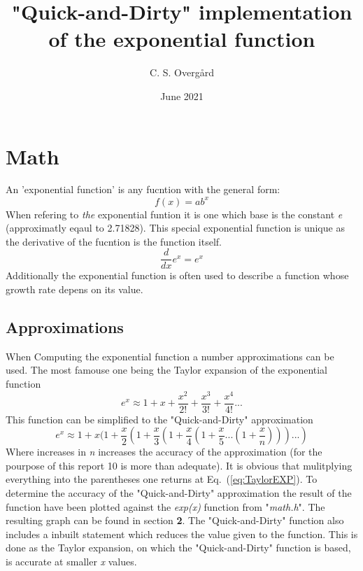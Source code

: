 \documentclass[12pt]{article}
\begin{document}
\title{"Quick-and-Dirty" implementation of the exponential function}
\author{C. S. Overgård}
\date{June 2021}
\maketitle
\section{Math}
An 'exponential function' is any fucntion with the general form:
  \begin{equation}
\label{eq:GenEXP}
f(x)=ab^x
	\end{equation}
When refering to \textit{the} exponential funtion it is one which base is the constant \textit{e} (approximatly eqaul to 2.71828). This special exponential function is unique as the derivative of the fucntion is the function itself.
  \begin{equation}
\label{eq:dxEXP}
\frac{d}{dx} e^x = e^x
  \end{equation}
Additionally the exponential function is often used to describe a function whose growth rate depens on its value.
\subsection{Approximations}
When Computing the exponential function a number approximations can be used. The most famouse one being the Taylor expansion of the exponential function
\begin{equation}
\label{eq:TaylorEXP}
e^x \approx 1 + x + \frac{x^2}{2!}+\frac{x^3}{3!}+\frac{x^4}{4!}...
\end{equation}
This function can be simplified to the "Quick-and-Dirty" approximation
\begin{equation}
\label{eq:QnD}
e^x \approx 1 + x(1+\frac{x}{2}(1+\frac{x}{3}(1+\frac{x}{4}(1+\frac{x}{5}...(1+\frac{x}{n})))...)
\end{equation}
Where increases in \textit{n} increases the accuracy of the approximation (for the pourpose of this report 10 is more than adequate). It is obvious that mulitplying everything into the parentheses one returns at Eq.~(\ref{eq:TaylorEXP}). To determine the accuracy of the "Quick-and-Dirty" approximation the result of the function have been plotted against the \textit{exp(x)} function from "\textit{math.h}". The resulting graph can be found in section \textbf{2}. The "Quick-and-Dirty" function also includes a inbuilt statement which reduces the value given to the function. This is done as the Taylor expansion, on which the "Quick-and-Dirty" function is based, is accurate at smaller \textit{x} values.
\pagebreak
\end{document}
